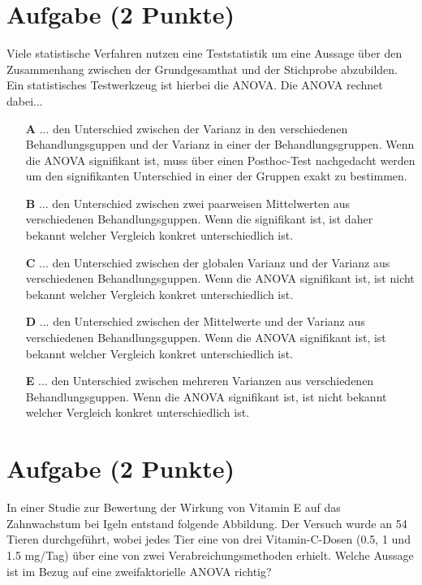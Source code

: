 \documentclass[a4paper, 9pt]{scrartcl}\usepackage[]{graphicx}\usepackage[]{xcolor}
\begin{document}
\section{Aufgabe \hfill (2 Punkte)}




Viele statistische Verfahren nutzen eine Teststatistik um eine Aussage über den Zusammenhang zwischen der Grundgesamthat und der Stichprobe abzubilden. Ein statistisches Testwerkzeug ist hierbei die ANOVA. Die ANOVA rechnet dabei...



\begin{enumerate}
\item [\textbf{A} \msquare] ... den Unterschied zwischen der Varianz in den verschiedenen Behandlungsguppen und der Varianz in einer der Behandlungsgruppen. Wenn die ANOVA signifikant ist, muss über einen Posthoc-Test nachgedacht werden um den signifikanten Unterschied in einer der Gruppen exakt zu bestimmen.
\item [\textbf{B} \msquare] ... den Unterschied zwischen zwei paarweisen Mittelwerten aus verschiedenen Behandlungsguppen. Wenn die signifikant ist, ist daher bekannt welcher Vergleich konkret unterschiedlich ist.
\item [\textbf{C} \msquare] ... den Unterschied zwischen der globalen Varianz und der Varianz aus verschiedenen Behandlungsguppen. Wenn die ANOVA signifikant ist, ist nicht bekannt welcher Vergleich konkret unterschiedlich ist.
\item [\textbf{D} \msquare] ... den Unterschied zwischen der Mittelwerte und der Varianz aus verschiedenen Behandlungsguppen. Wenn die ANOVA signifikant ist, ist bekannt welcher Vergleich konkret unterschiedlich ist.
\item [\textbf{E} \msquare] ... den Unterschied zwischen mehreren Varianzen aus verschiedenen Behandlungsguppen. Wenn die ANOVA signifikant ist, ist nicht bekannt welcher Vergleich konkret unterschiedlich ist.
\end{enumerate} 

\section{Aufgabe \hfill (2 Punkte)}



In einer Studie zur Bewertung der Wirkung von Vitamin E auf das Zahnwachstum bei Igeln entstand folgende Abbildung. Der Versuch wurde an 54 Tieren durchgeführt, wobei jedes Tier eine von  drei Vitamin-C-Dosen (0.5, 1 und 1.5 mg/Tag) über eine von zwei Verabreichungsmethoden erhielt. Welche Aussage ist im Bezug auf eine zweifaktorielle ANOVA richtig?
\end{document}
